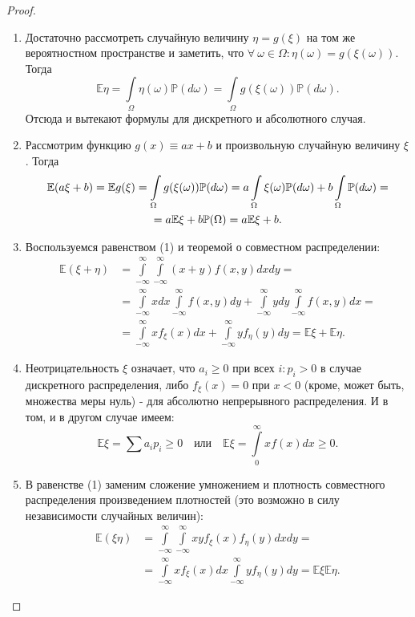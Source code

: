 \begin{proof}
\begin{enumerate}
    \item Достаточно рассмотреть случайную величину $\eta = g(\xi)$ на том же вероятностном пространстве и заметить, что $\forall \: \omega \in \Omega \colon \eta(\omega) = g(\xi(\omega))$. Тогда 
    $$ \mathbb{E}\eta = \int\limits_{\Omega} \eta(\omega) \mathbb{P}(d\omega) = \int\limits_{\Omega} g(\xi(\omega)) \mathbb{P}(d\omega). $$
    Отсюда и вытекают формулы для дискретного и абсолютного случая.
    
    \item Рассмотрим функцию $g(x) \equiv ax + b$ и произвольную случайную величину $\xi$. Тогда 
    \begin{multline*}
        \mathbb{E}(a \xi + b) 
        = \mathbb{E}g(\xi) 
        = \int\limits_{\Omega}g(\xi(\omega))\mathbb{P}(d\omega)
        = a \int\limits_{\Omega}\xi(\omega)\mathbb{P}(d\omega) + b \int\limits_{\Omega}\mathbb{P}(d\omega) = \\
        = a \mathbb{E}\xi + b {\mathbb{P}(\Omega)} = a \mathbb{E}\xi + b.
    \end{multline*}
    
    \item Воспользуемся равенством (1) и теоремой о совместном распределении:
        $$\begin{aligned}
        \mathbb{E}(\xi+\eta) &=\int\limits_{-\infty}^{\infty} \int\limits_{-\infty}^{\infty}(x+y) f(x, y) d x d y=\\
        &=\int\limits_{-\infty}^{\infty} x d x \int\limits_{-\infty}^{\infty} f(x, y) d y+\int\limits_{-\infty}^{\infty} y d y \int\limits_{-\infty}^{\infty} f(x, y) d x=\\
        &=\int\limits_{-\infty}^{\infty} x f_{\xi}(x) d x+\int\limits_{-\infty}^{\infty} y f_{\eta}(y) d y=\mathbb{E} \xi+\mathbb{E} \eta.
        \end{aligned}$$
    \item Неотрицательность $\xi$ означает, что $a_i \geqslant 0$ при всех $i \colon p_i > 0$ в случае дискретного распределения, либо $f_\xi(x) = 0$ при $x < 0$ (кроме, может быть, множества меры нуль) - для абсолютно непрерывного распределения. И в том, и в другом случае имеем:
        $$\mathbb{E} \xi=\sum a_{i} p_{i} \geqslant 0 \quad \text {или} \quad \mathbb{E} \xi=\int\limits_{0}^{\infty} x f(x) d x \geqslant 0.$$
        
    \item В равенстве (1) заменим сложение умножением и плотность совместного распределения произведением плотностей (это возможно в силу независимости случайных величин):
        $$\begin{aligned}
        \mathbb{E}(\xi \eta) &=\int\limits_{-\infty}^{\infty} \int\limits_{-\infty}^{\infty} x y f_{\xi}(x) f_{\eta}(y) d x d y=\\
        &=\int\limits_{-\infty}^{\infty} x f_{\xi}(x) d x \int\limits_{-\infty}^{\infty} y f_{\eta}(y) d y=\mathbb{E} \xi \mathbb{E} \eta.
        \end{aligned}$$
        

\end{enumerate}
\end{proof}
